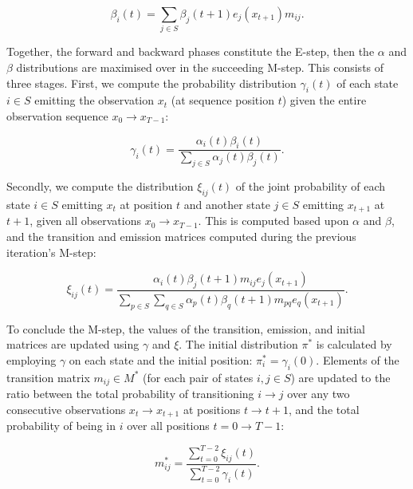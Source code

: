 \documentclass[a4paper, 11pt]{article}
\begin{document}
	\begin{equation}
		\beta_{i} \left(t \right) = \sum_{j \in S} \beta_{j} \left(t+1 \right) e_{j} \left(x_{t+1} \right) m_{ij}
		\text{.}
		\label{eq:beta}
	\end{equation}

	Together, the forward and backward phases constitute the E-step, then the $\alpha$ and $\beta$ distributions are maximised over in the succeeding M-step. This consists of three stages. First, we compute the probability distribution $\gamma_i \left(t \right)$ of each state $i \in S$ emitting the observation $x_{t}$ (at sequence position $t$) given the entire observation sequence $x_{0} \to x_{T-1}$:

	\begin{equation}
		\gamma_i \left(t \right) = \frac{\alpha_{i} \left(t \right) \beta_{i} \left(t \right)}{\sum_{j \in S} \alpha_{j} \left(t \right) \beta_{j} \left(t \right)}
		\text{.}
		\label{eq:gamma}
	\end{equation}
	
	Secondly, we compute the distribution $\xi_{ij} \left(t \right)$ of the joint probability of each state $i \in S$ emitting $x_{t}$ at position $t$ and another state $j \in S$ emitting $x_{t+1}$ at $t+1$, given all observations $x_{0} \to x_{T-1}$. This is computed based upon $\alpha$ and $\beta$, and the transition and emission matrices computed during the previous iteration's M-step:

	\begin{equation}
		\xi_{ij} \left(t \right) = \frac{\alpha_{i} \left(t \right) \beta_{j} \left(t+1 \right) m_{ij} e_{j} \left(x_{t+1} \right)}{\sum_{p \in S} \sum_{q \in S} \alpha_{p} \left(t \right) \beta_{q} \left(t+1 \right) m_{pq} e_{q} \left(x_{t+1} \right)}
		\text{.}
		\label{eq:xi}
	\end{equation}
	
	To conclude the M-step, the values of the transition, emission, and initial matrices are updated using $\gamma$ and $\xi$. The initial distribution $\pi^{*}$ is calculated by employing $\gamma$ on each state and the initial position: $\pi^{*}_{i} = \gamma_{i} \left(0 \right)$. Elements of the transition matrix $m_{ij} \in M^{*}$ (for each pair of states $i, j \in S$) are updated to the ratio between the total probability of transitioning $i \to j$ over any two consecutive observations $x_{t} \to x_{t+1}$ at positions $t \to t+1$, and the total probability of being in $i$ over all positions $t = 0 \to T-1$:

	\begin{equation}
		m_{ij}^{*} = \frac{\sum_{t=0}^{T-2} \xi_{ij} \left(t \right)}{\sum_{t=0}^{T-2} \gamma_{i} \left(t \right)}
		\text{.}
		\label{eq:transition}
	\end{equation}
	
\end{document}
